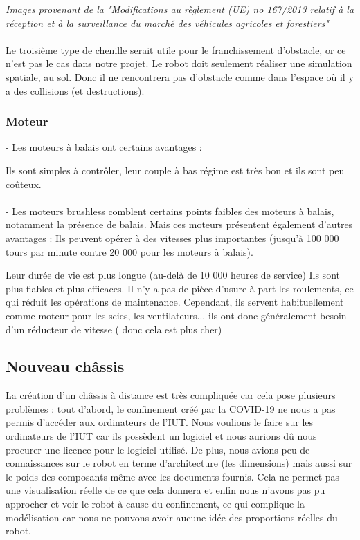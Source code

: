 \documentclass{PackagerQualityN}
\begin{document}



\textit{Images provenant de la "Modifications au règlement (UE) no 167/2013 relatif à la réception et à la surveillance du marché des véhicules agricoles et forestiers"}
\\\\
Le troisième type de chenille serait utile pour le franchissement d'obstacle, or ce n'est pas le cas dans notre projet. Le robot doit seulement réaliser une simulation spatiale, au sol. Donc il ne rencontrera pas d'obstacle comme dans l'espace où il y a des collisions (et destructions).

\subsubsection{Moteur}
- Les moteurs à balais ont certains avantages :

Ils sont simples à contrôler, leur couple à bas régime est très bon et ils sont peu coûteux.
\paragraph{}
- Les moteurs brushless comblent certains points faibles des moteurs à balais, notamment la présence de balais. Mais ces moteurs présentent également d’autres avantages :
Ils peuvent opérer à des vitesses plus importantes  (jusqu’à 100 000 tours par minute contre 20 000 pour les moteurs à balais).

Leur durée de vie est plus longue (au-delà de 10 000 heures de service)
Ils sont plus fiables et plus efficaces.
Il n’y a pas de pièce d’usure à part les roulements, ce qui réduit les opérations de maintenance.
Cependant, ils servent habituellement comme moteur pour les scies, les ventilateurs... ils ont donc généralement besoin d'un réducteur de vitesse ( donc cela est plus cher)
\subsection{Nouveau châssis}


La création d'un châssis à distance est très compliquée car cela pose plusieurs problèmes : tout d'abord, le confinement créé par la COVID-19 ne nous a pas permis d'accéder aux ordinateurs de l'IUT. Nous voulions le faire sur les ordinateurs de l'IUT car ils possèdent un logiciel et nous aurions dû nous procurer une licence pour le logiciel utilisé. De plus, nous avions peu de connaissances sur le robot en terme d'architecture (les dimensions) mais aussi sur le poids des composants même avec les documents fournis. Cela ne permet pas une visualisation réelle de ce que cela donnera et enfin nous n'avons pas pu approcher et voir le robot à cause du confinement, ce qui complique la modélisation car nous ne pouvons avoir aucune idée des proportions réelles du robot.
\end{document}

